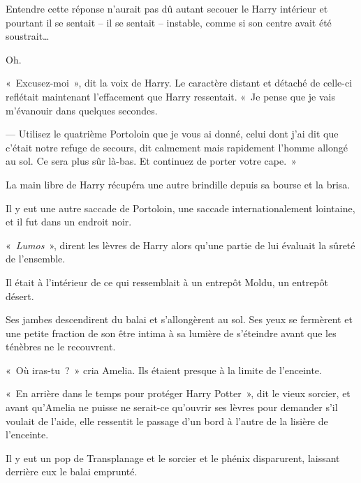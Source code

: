 Entendre cette réponse n'aurait pas dû autant secouer le Harry intérieur et pourtant il se sentait -- il se sentait -- instable, comme si son centre avait été soustrait…

Oh.

«~Excusez-moi~», dit la voix de Harry.
Le caractère distant et détaché de celle-ci reflétait maintenant l'effacement que Harry ressentait.
«~Je pense que je vais m'évanouir dans quelques secondes.

--- Utilisez le quatrième Portoloin que je vous ai donné, celui dont j'ai dit que c'était notre refuge de secours, dit calmement mais rapidement l'homme allongé au sol.
Ce sera plus sûr là-bas.
Et continuez de porter votre cape.~»

La main libre de Harry récupéra une autre brindille depuis sa bourse et la brisa.

Il y eut une autre saccade de Portoloin, une saccade internationalement lointaine, et il fut dans un endroit noir.

«~\emph{Lumos}~», dirent les lèvres de Harry alors qu'une partie de lui évaluait la sûreté de l'ensemble.

Il était à l'intérieur de ce qui ressemblait à un entrepôt Moldu, un entrepôt désert.

Ses jambes descendirent du balai et s'allongèrent au sol.
Ses yeux se fermèrent et une petite fraction de son être intima à sa lumière de s'éteindre avant que les ténèbres ne le recouvrent.

\later

«~Où iras-tu~?~»
cria Amelia.
Ils étaient presque à la limite de l'enceinte.

«~En arrière dans le temps pour protéger Harry Potter~», dit le vieux sorcier, et avant qu'Amelia ne puisse ne serait-ce qu'ouvrir ses lèvres pour demander s'il voulait de l'aide, elle ressentit le passage d'un bord à l'autre de la lisière de l'enceinte.

Il y eut un pop de Transplanage et le sorcier et le phénix disparurent, laissant derrière eux le balai emprunté.
